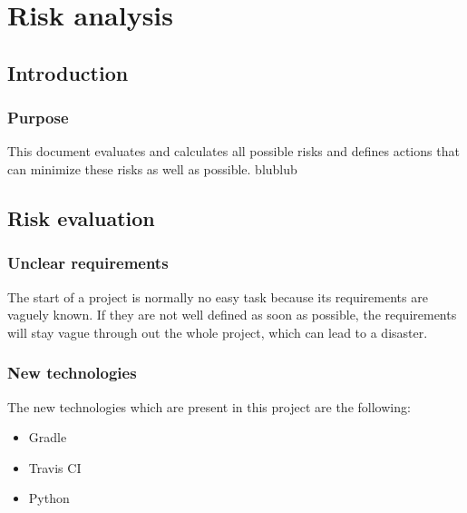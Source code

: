 
\chapter{Risk analysis} %

\label{ChapterX} %



\section{Introduction}

\subsection{Purpose}

This document evaluates and calculates all possible risks and defines actions that can minimize these risks as well as possible.
blublub

\section{Risk evaluation}

\subsection{Unclear requirements}

The start of a project is normally no easy task because its requirements are vaguely known. If they are not well defined as soon as possible, the requirements will stay vague through out the whole project, which can lead to a disaster. 

\subsection{New technologies}

The new technologies which are present in this project are the following:

 \begin{itemize}
    \item Gradle
    \item Travis CI
    \item Python
\end{itemize}

